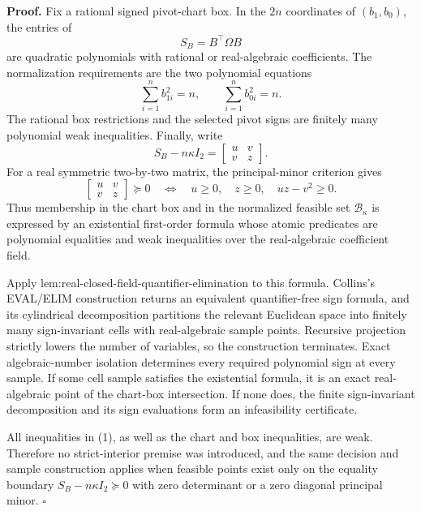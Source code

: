 \textbf{Proof.}
Fix a rational signed pivot-chart box.  In the \(2n\) coordinates of \((b_1,b_0)\), the entries of
\[
 S_B=B^{\top}\Omega B
\]
are quadratic polynomials with rational or real-algebraic coefficients.  The normalization requirements are the two polynomial equations
\[
 \sum_{i=1}^n b_{1i}^2=n,
 \qquad
 \sum_{i=1}^n b_{0i}^2=n.
\]
The rational box restrictions and the selected pivot signs are finitely many polynomial weak inequalities.  Finally, write
\[
 S_B-n\kappa I_2=
 \begin{bmatrix}u&v\\v&z\end{bmatrix}.
\]
For a real symmetric two-by-two matrix, the principal-minor criterion gives
\[
 \begin{bmatrix}u&v\\v&z\end{bmatrix}\succeq0
 \quad\Longleftrightarrow\quad
 u\ge0,\quad z\ge0,\quad uz-v^2\ge0. \tag{1}
\]
Thus membership in the chart box and in the normalized feasible set \(\mathcal B_\kappa\) is expressed by an existential first-order formula whose atomic predicates are polynomial equalities and weak inequalities over the real-algebraic coefficient field.

Apply lem:real-closed-field-quantifier-elimination to this formula.  Collins's EVAL/ELIM construction returns an equivalent quantifier-free sign formula, and its cylindrical decomposition partitions the relevant Euclidean space into finitely many sign-invariant cells with real-algebraic sample points.  Recursive projection strictly lowers the number of variables, so the construction terminates.  Exact algebraic-number isolation determines every required polynomial sign at every sample.  If some cell sample satisfies the existential formula, it is an exact real-algebraic point of the chart-box intersection.  If none does, the finite sign-invariant decomposition and its sign evaluations form an infeasibility certificate.

All inequalities in (1), as well as the chart and box inequalities, are weak.  Therefore no strict-interior premise was introduced, and the same decision and sample construction applies when feasible points exist only on the equality boundary \(S_B-n\kappa I_2\succeq0\) with zero determinant or a zero diagonal principal minor. \(\square\)